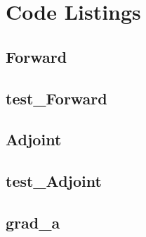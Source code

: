 \documentclass[letterpaper, 10pt]{amsart}
\theoremstyle{definition}
\theoremstyle{remark}
\begin{document}
\section{Code Listings}
{\small 
\subsection{Forward}\label{sec:code-listing-forward}


\subsection{test\_Forward}\label{sec:code-listing-test-forward}


\subsection{Adjoint}\label{sec:code-listing-adjoint}


\subsection{test\_Adjoint}\label{sec:code-listing-test-adjoint}


\subsection{grad\_a}\label{sec:code-listing-grad-s}

}
\end{document}
